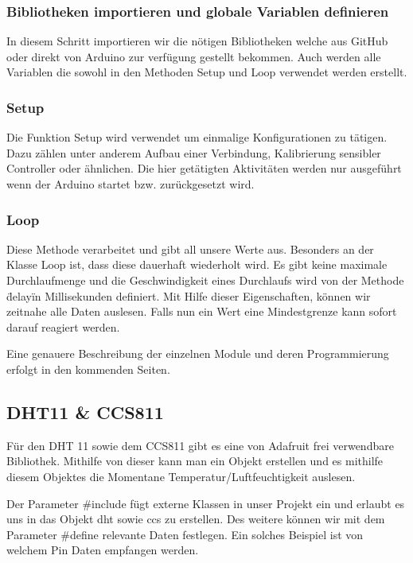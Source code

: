 \subsubsection{Bibliotheken importieren und globale Variablen definieren}

In diesem Schritt importieren wir die nötigen Bibliotheken welche aus GitHub oder direkt von Arduino zur verfügung gestellt bekommen. Auch werden alle Variablen die sowohl in den Methoden Setup und Loop verwendet werden erstellt. 

\subsubsection{Setup}

Die Funktion Setup wird verwendet um einmalige Konfigurationen zu tätigen. Dazu zählen unter anderem Aufbau einer Verbindung, Kalibrierung sensibler Controller oder ähnlichen. Die hier getätigten Aktivitäten werden nur ausgeführt wenn der Arduino startet bzw. zurückgesetzt wird.

\subsubsection{Loop}

Diese Methode verarbeitet und gibt all unsere Werte aus. Besonders an der Klasse Loop ist, dass diese dauerhaft wiederholt wird. Es gibt keine maximale Durchlaufmenge und die Geschwindigkeit eines Durchlaufs wird von der Methode \"delay\" in Millisekunden definiert. Mit Hilfe dieser Eigenschaften, können wir zeitnahe alle Daten auslesen. Falls nun ein Wert eine Mindestgrenze kann sofort darauf reagiert werden. 

Eine genauere Beschreibung der einzelnen Module und deren Programmierung erfolgt in den kommenden Seiten.



\subsection{DHT11 \& CCS811}

Für den DHT 11 sowie dem CCS811 gibt es eine von Adafruit frei verwendbare Bibliothek. Mithilfe von dieser kann man ein Objekt erstellen und es mithilfe diesem Objektes die Momentane Temperatur/Luftfeuchtigkeit auslesen.



Der Parameter \#include fügt externe Klassen in unser Projekt ein und erlaubt es uns in das Objekt dht sowie ccs zu erstellen.
Des weitere können wir mit dem Parameter \#define relevante Daten festlegen. Ein solches Beispiel ist von welchem Pin Daten empfangen werden.

